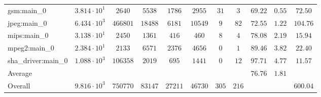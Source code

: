 \begin{tabular}{|l|c|c|c|c|c|c|c|c|c|c|}
gsm:main\_0             & $ 3.814 \cdot 10^{1} $ & $ 2640   $ & $ 5538  $ & $ 1786  $ & $ 2955  $ & $ 31  $ & $ 3   $ & $ 69.22       $ & $ 0.55    $ & $ 72.50   $ \\
jpeg:main\_0            & $ 6.434 \cdot 10^{3} $ & $ 466801 $ & $ 18488 $ & $ 6181  $ & $ 10549 $ & $ 9   $ & $ 82  $ & $ 72.55       $ & $ 1.22    $ & $ 104.76  $ \\
mips:main\_0            & $ 3.138 \cdot 10^{1} $ & $ 2450   $ & $ 1361  $ & $ 416   $ & $ 460   $ & $ 8   $ & $ 4   $ & $ 78.08       $ & $ 2.19    $ & $ 15.94   $ \\
mpeg2:main\_0           & $ 2.384 \cdot 10^{1} $ & $ 2133   $ & $ 6571  $ & $ 2376  $ & $ 4656  $ & $ 0   $ & $ 1   $ & $ 89.46       $ & $ 3.82    $ & $ 22.40   $ \\
sha\_driver:main\_0     & $ 1.088 \cdot 10^{3} $ & $ 106358 $ & $ 2019  $ & $ 695   $ & $ 1441  $ & $ 0   $ & $ 12  $ & $ 97.71       $ & $ 4.77    $ & $ 11.57   $ \\
\hline
Average                 & $                    $ & $        $ & $       $ & $       $ & $       $ & $     $ & $     $ & $ 76.76       $ & $ 1.81    $ & $         $ \\
\hline
Overall                 & $ 9.816 \cdot 10^{3} $ & $ 750770 $ & $ 83147 $ & $ 27211 $ & $ 46730 $ & $ 305 $ & $ 216 $ & $             $ & $         $ & $ 600.04  $ \\
\hline
\end{tabular}
